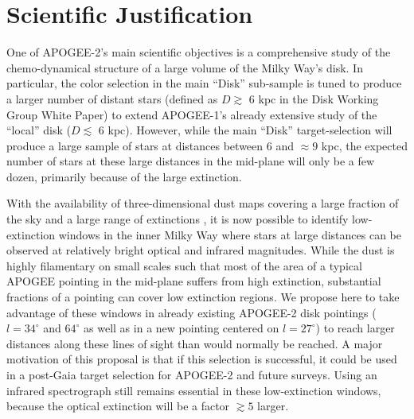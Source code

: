 \documentclass[12pt,preprint]{aastex}
\newcommand{\eg}{e.g.}
\begin{document}
\newpage
\section{Scientific Justification}

One of APOGEE-2's main scientific objectives is a comprehensive study
of the chemo-dynamical structure of a large volume of the Milky Way's
disk. In particular, the color selection in the main ``Disk''
sub-sample is tuned to produce a larger number of distant stars
(defined as $D\gtrsim$ 6 kpc in the Disk Working Group White Paper) to
extend APOGEE-1's already extensive study of the ``local'' disk ($D
\lesssim$ 6 kpc). However, while the main ``Disk'' target-selection
will produce a large sample of stars at distances between 6 and
$\approx9$ kpc, the expected number of stars at these large distances
in the mid-plane will only be a few dozen, primarily because of the
large extinction.

With the availability of three-dimensional dust maps covering a large
fraction of the sky and a large range of extinctions
\citep[\eg,][]{Marshall06a,Green15a}, it is now possible to identify
low-extinction windows in the inner Milky Way where stars at large
distances can be observed at relatively bright optical and infrared
magnitudes. While the dust is highly filamentary on small scales such
that most of the area of a typical APOGEE pointing in the mid-plane
suffers from high extinction, substantial fractions of a pointing can
cover low extinction regions. We propose here to take advantage of
these windows in already existing APOGEE-2 disk pointings
($l=34^\circ$ and $64^\circ$ as well as in a new pointing centered on
$l=27^\circ$) to reach larger distances along these lines of sight
than would normally be reached. A major motivation of this proposal is
that if this selection is successful, it could be used in a post-Gaia
target selection for APOGEE-2 and future surveys. Using an infrared
spectrograph still remains essential in these low-extinction windows,
because the optical extinction will be a factor $\gtrsim5$ larger.
\end{document}
